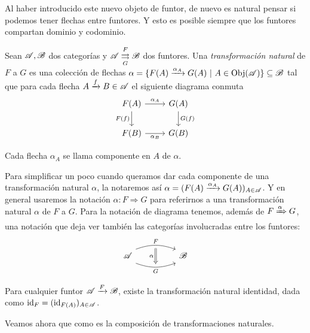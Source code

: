 \documentclass{comunicaciones}
\begin{document}
Al haber introducido este nuevo objeto de funtor, de nuevo es natural pensar si podemos tener flechas entre funtores. Y esto es posible siempre que los funtores
compartan dominio y codominio.

\begin{dfn}
    Sean $\mathscr A,\mathscr B$ dos categorías y $\mathscr A\overset{F}{\underset{G}{\rightrightarrows}}\mathscr B$ dos funtores. Una \emph{transformación natural} de $F$ a $G$
    es una colección de flechas $\alpha=\{F(A)\xrightarrow{\alpha_A}G(A) \ |\ A\in\Obj(\A)\}\subseteq\B$ tal que para cada flecha $A\xrightarrow{f}B\in\mathscr A$ el siguiente diagrama conmuta
    \[\begin{tikzcd}
        {F(A)} & {G(A)} \\
        {F(B)} & {G(B)}
        \arrow["{\alpha_A}", from=1-1, to=1-2]
        \arrow["{F(f)}"', from=1-1, to=2-1]
        \arrow["{G(f)}", from=1-2, to=2-2]
        \arrow["{\alpha_B}"', from=2-1, to=2-2]
    \end{tikzcd}\]

    Cada flecha $\alpha_A$ se llama componente en $A$ de $\alpha$.
\end{dfn}

Para simplificar un poco cuando queramos dar cada componente de una transformación natural $\alpha$, la notaremos así $\alpha=(F(A)\xrightarrow{\alpha_A}G(A))_{A\in\mathscr A}$.
Y en general usaremos la notación $\alpha:F\Rightarrow G$ para referirnos a una transformación natural $\alpha$ de $F$ a $G$. Para la notación de diagrama tenemos, además
de $F\xRightarrow{\alpha}G$, una notación que deja ver también las categorías involucradas entre los funtores:
\[
\begin{tikzcd}
	\A && \B
	\arrow[""{name=0, anchor=center, inner sep=0}, "F", shift left=2, out=20, in=160, from=1-1, to=1-3]
	\arrow[""{name=1, anchor=center, inner sep=0}, "G"', shift right=2, out=340, in=200, from=1-1, to=1-3]
	\arrow["\alpha"', shorten <=3pt, shorten >=3pt, Rightarrow, from=0, to=1]
\end{tikzcd}
\]

\begin{ej}
    \item Para cualquier funtor $\mathscr A\xrightarrow{F}\mathscr B$, existe la transformación natural identidad, dada como $\mathrm{id}_F=(\mathrm{id}_{F(A)})_{A\in\mathscr A}$.
    \item  
\end{ej}

Veamos ahora que como es la composición de transformaciones naturales.
\end{document}

